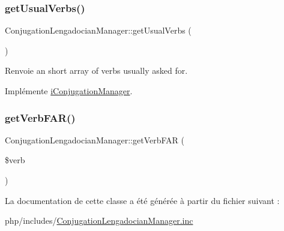 \hypertarget{class_conjugation_lengadocian_manager_a1ec18e3663eae35578b4f1967e4d981d}{}\label{class_conjugation_lengadocian_manager_a1ec18e3663eae35578b4f1967e4d981d} 
\subsubsection{\texorpdfstring{get\+Usual\+Verbs()}{getUsualVerbs()}}
{\footnotesize\ttfamily Conjugation\+Lengadocian\+Manager\+::get\+Usual\+Verbs (\begin{DoxyParamCaption}{ }\end{DoxyParamCaption})}

\begin{DoxyReturn}{Renvoie}
an short array of verbs usually asked for. 
\end{DoxyReturn}


Implémente \hyperlink{interfacei_conjugation_manager_a2a7ed39313c1c92ef5c01c88895de36e}{i\+Conjugation\+Manager}.

\hypertarget{class_conjugation_lengadocian_manager_a5e9c807113463d8d0044e3ba13937fa1}{}\label{class_conjugation_lengadocian_manager_a5e9c807113463d8d0044e3ba13937fa1} 
\subsubsection{\texorpdfstring{get\+Verb\+F\+A\+R()}{getVerbFAR()}}
{\footnotesize\ttfamily Conjugation\+Lengadocian\+Manager\+::get\+Verb\+F\+AR (\begin{DoxyParamCaption}\item[{}]{\$verb }\end{DoxyParamCaption})}



La documentation de cette classe a été générée à partir du fichier suivant \+:\begin{DoxyCompactItemize}
\item 
php/includes/\hyperlink{_conjugation_lengadocian_manager_8inc}{Conjugation\+Lengadocian\+Manager.\+inc}\end{DoxyCompactItemize}
